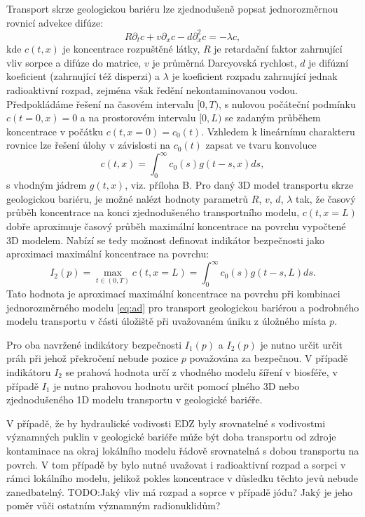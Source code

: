 \documentclass{article}
\def\todo#1{{TODO:\color{red}#1}}
\begin{document}
Transport skrze geologickou bariéru lze zjednodušeně popsat jednorozměrnou rovnicí advekce difúze:
\begin{equation}
    \label{eq:ad}
    R\partial_t c + v \partial_x c - d \partial^2_x c = - \lambda c,
\end{equation}
kde $c(t,x)$ je koncentrace rozpuštěné látky, $R$ je retardační faktor zahrnující vliv sorpce a difúze do matrice, $v$ je průměrná Darcyovská rychlost, $d$ je difúzní koeficient (zahrnující též disperzi) a $\lambda$
je koeficient rozpadu zahrnující jednak radioaktivní rozpad, zejména však ředění nekontaminovanou vodou. 
Předpokládáme řešení na časovém intervalu  $[0, T)$, s nulovou počáteční podmínku $c(t=0, x) = 0$ a na prostorovém intervalu $[0, L)$ se zadaným 
průběhem koncentrace v počátku $c(t, x=0) = c_0(t)$.
Vzhledem k lineárnímu charakteru rovnice lze řešení úlohy v závislosti na $c_0(t)$ zapsat ve tvaru konvoluce
\begin{equation}
    c(t, x) = \int_{0}^\infty c_0(s) g(t - s, x) ds,
\end{equation}
s  vhodným jádrem $g(t, x)$, viz. příloha B. 
Pro daný 3D model transportu skrze geologickou bariéru, je možné 
nalézt hodnoty parametrů $R$, $v$, $d$, $\lambda$ tak, že časový průběh koncentrace na konci zjednodušeného transportního modelu, $c(t, x=L)$ dobře aproximuje časový průběh maximální koncentrace na povrchu vypočtené 3D modelem. Nabízí se tedy možnost definovat indikátor bezpečnosti jako aproximaci maximální koncentrace na povrchu: 
\begin{equation}
    I_2(p) =  \max_{t\in(0, T)} c(t, x=L) = \int_{0}^\infty c_0(s) g(t-s, L) ds.
\end{equation}
Tato hodnota je aproximací maximální koncentrace na povrchu
při kombinaci jednorozměrného modelu \ref{eq:ad} pro transport geologickou bariérou a podrobného modelu transportu v části úložiště při uvažovaném úniku z úložného místa $p$. 

Pro oba navržené indikátory bezpečnosti $I_1(p)$ a $I_2(p)$ je nutno určit určit práh při jehož překročení nebude pozice $p$ považována za bezpečnou. V případě indikátoru $I_2$ se prahová hodnota určí z vhodného modelu šíření  v biosféře, v případě $I_1$ je nutno prahovou hodnotu určit pomocí plného 3D nebo zjednodušeného 1D modelu transportu v geologické bariéře.

V případě, že by hydraulické vodivosti EDZ byly srovnatelné s vodivostmi významných puklin v geologické bariéře může být doba transportu od zdroje kontaminace na okraj lokálního modelu řádově srovnatelná s dobou transportu na povrch. V tom případě by bylo nutné uvažovat i radioaktivní rozpad a sorpci v rámci lokálního modelu, jelikož pokles koncentrace v důsledku těchto jevů nebude zanedbatelný. 
\todo{Jaký vliv má rozpad a soprce v případě jódu? Jaký je jeho poměr vůči ostatním významným radionuklidům?}
\end{document}
